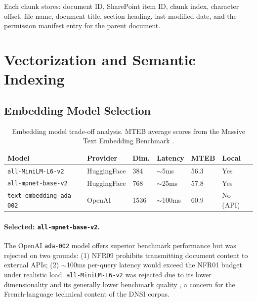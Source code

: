 Each chunk stores: document ID, SharePoint item ID, chunk index, character offset, file name, document title, section heading, last modified date, and the permission manifest entry for the parent document.

\section{Vectorization and Semantic Indexing}
\label{sec:arch-vectorization}

\subsection{Embedding Model Selection}

\begin{table}[H]
\centering
\caption{Embedding model trade-off analysis. MTEB average scores from the Massive Text Embedding Benchmark \citep{Muennighoff2023}.}
\label{tab:embedding-models}
\begin{tabularx}{\textwidth}{@{}lXllll@{}}
\toprule
\textbf{Model} & \textbf{Provider} & \textbf{Dim.} & \textbf{Latency} & \textbf{MTEB} & \textbf{Local} \\
\midrule
\texttt{all-MiniLM-L6-v2} & HuggingFace & 384 & $\sim$5ms & 56.3 & Yes \\
\texttt{all-mpnet-base-v2} & HuggingFace & 768 & $\sim$25ms & 57.8 & Yes \\
\texttt{text-embedding-ada-002} & OpenAI & 1536 & $\sim$100ms & 60.9 & No (API) \\
\bottomrule
\end{tabularx}
\end{table}

\paragraph{Selected: \texttt{all-mpnet-base-v2}.} The OpenAI \texttt{ada-002} model offers superior benchmark performance but was rejected on two grounds: (1) NFR09 prohibits transmitting document content to external APIs; (2) $\sim$100ms per-query latency would exceed the NFR01 budget under realistic load. \texttt{all-MiniLM-L6-v2} was rejected due to its lower dimensionality and its generally lower benchmark quality \citep{Muennighoff2023}, a concern for the French-language technical content of the DNSI corpus.

